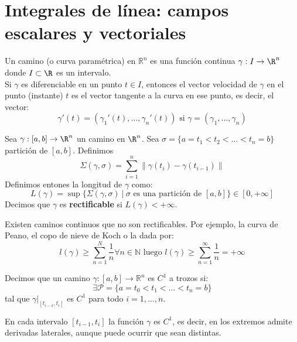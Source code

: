 \section{Integrales de línea: campos escalares y vectoriales}

\begin{definición}[Camino]
Un camino (o curva paramétrica) en $\mathbb{R}^n$ es una función continua $\gamma: I \to \R^n$ donde $I \subset \R$ es un intervalo. \\
Si $\gamma$ es diferenciable en un punto $t \in I$, entonces el vector velocidad de $\gamma$ en el punto (instante) $t$ es el vector tangente a la curva en ese punto, es decir, el vector:
$$\gamma'(t) = (\gamma_1'(t), \ldots, \gamma_n'(t)) \text{ si } \gamma = (\gamma_1, \ldots, \gamma_n)$$
\end{definición}

\begin{definición}
Sea $\gamma: [a,b] \to \R^n$ un camino en $\R^n$. Sea $\sigma = \{a = t_1 < t_2 < \ldots < t_n = b\}$ partición de $[a,b]$. Definimos $$\Sigma(\gamma, \sigma) = \sum_{i = 1}^{n} \lVert \gamma(t_i) - \gamma(t_{i-1}) \rVert $$
Definimos entones la longitud de $\gamma$ como: $$L(\gamma) = \sup\{\Sigma(\gamma, \sigma) \ | \  \sigma \text{ es una partición de } [a, b]\} \in [0, + \infty]$$
Decimos que $\gamma$ es \textbf{rectificable} si $L(\gamma) < + \infty$.
\end{definición}

\begin{observación}
Existen caminos continuos que no son rectificables. Por ejemplo, la curva de Peano, el copo de nieve de Koch o la dada por:
$$l(\gamma) \geq \sum_{n = 1}^{N}\frac{1}{n} \forall n \in \mathbb{N} \text{ luego } l(\gamma) \geq \sum_{n = 1}^{\infty}\frac{1}{n} = + \infty$$
\end{observación}

\begin{definición}
Decimos que un camino $\gamma: [a, b] \to \mathbb{R}^n$ es $C^1$ a trozos si:
$$\exists \mathcal{P} = \{a = t_0 < t_1 < \ldots < t_n = b\}$$ tal que $\gamma|_{[t_{i-1}, t_i]}$ es $C^1$ para todo $i = 1, \ldots, n$.
\end{definición}

\begin{observación}
En cada intervalo $[t_{i-1}, t_i]$ la función $\gamma$ es $C^1$, es decir, en los extremos admite derivadas laterales, aunque puede ocurrir que sean distintas.
\end{observación}

